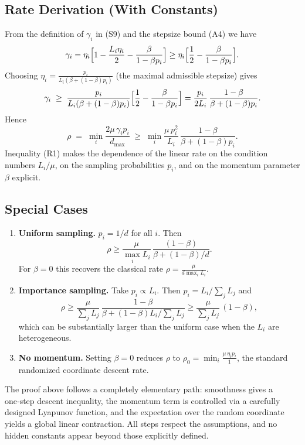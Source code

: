 \documentclass[11pt]{article}
\begin{document}
\subsection*{Rate Derivation (With Constants)}
From the definition of $\gamma_i$ in (S9) and the stepsize bound (A4) we have
\[
\gamma_i
= \eta_i\Bigl[1-\frac{L_i\eta_i}{2}
      -\frac{\beta}{1-\beta p_i}\Bigr]
\ge \eta_i\Bigl[\frac{1}{2}
      -\frac{\beta}{1-\beta p_i}\Bigr].
\]
Choosing $\eta_i= \frac{p_i}{L_i(\beta+(1-\beta)p_i)}$
(the maximal admissible stepsize) gives
\[
\gamma_i \;\ge\;
\frac{p_i}{L_i(\beta+(1-\beta)p_i)}
\Bigl[\frac12-\frac{\beta}{1-\beta p_i}\Bigr]
=
\frac{p_i}{2L_i}\,
\frac{1-\beta}{\beta+(1-\beta)p_i}.
\]
Hence
\[
\rho
\;=\;
\min_i \frac{2\mu\,\gamma_i p_i}{d_{\max}}
\;\ge\;
\min_i
\frac{\mu\,p_i^{2}}{L_i}\,
\frac{1-\beta}{\beta+(1-\beta)p_i}.
\tag{R1}
\]
Inequality (R1) makes the dependence of the linear rate on the
condition numbers $L_i/\mu$, on the sampling probabilities $p_i$,
and on the momentum parameter $\beta$ explicit.

\subsection*{Special Cases}
\begin{enumerate}
\item \textbf{Uniform sampling.}
$p_i=1/d$ for all $i$.  Then
\[
\rho
\ge \frac{\mu}{\max_i L_i}\,
      \frac{(1-\beta)}{\beta+(1-\beta)/d}.
\]
For $\beta=0$ this recovers the classical rate
$\rho =\frac{\mu}{d\max_i L_i}$.
\item \textbf{Importance sampling.}
Take $p_i\propto L_i$.  Then $p_i = L_i/\sum_j L_j$ and
\[
\rho\ge
\frac{\mu}{\sum_j L_j}\,
\frac{1-\beta}{\beta+(1-\beta)L_i/\sum_j L_j}
\ge
\frac{\mu}{\sum_j L_j}\,(1-\beta),
\]
which can be substantially larger than the uniform case when the
$L_i$ are heterogeneous.
\item \textbf{No momentum.}
Setting $\beta=0$ reduces $\rho$ to
$\displaystyle\rho_{0}= \min_i \frac{\mu\,\eta_i p_i}{1}$,
the standard randomized coordinate descent rate.
\end{enumerate}

\bigskip
The proof above follows a completely elementary path:
smoothness gives a one‑step descent inequality, the momentum term
is controlled via a carefully designed Lyapunov function, and the
expectation over the random coordinate yields a global linear
contraction.  All steps respect the assumptions, and no hidden
constants appear beyond those explicitly defined.
\end{document}
